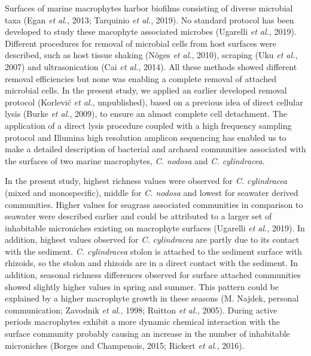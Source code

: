 \documentclass[12pt,]{article}
\begin{document}
Surfaces of marine macrophytes harbor biofilms consisting of diverse
microbial taxa (Egan \emph{et al.}, 2013; Tarquinio \emph{et al.},
2019). No standard protocol has been developed to study these macophyte
associated microbes (Ugarelli \emph{et al.}, 2019). Different procedures
for removal of microbial cells from host surfaces were described, such
as host tissue shaking (Nõges \emph{et al.}, 2010), scraping (Uku
\emph{et al.}, 2007) and ultrasonication (Cai \emph{et al.}, 2014). All
these methods showed different removal efficiencies but none was
enabling a complete removal of attached microbial cells. In the present
study, we applied an earlier developed removal protocol (Korlević
\emph{et al.}, unpublished), based on a previous idea of direct cellular
lysis (Burke \emph{et al.}, 2009), to ensure an almost complete cell
detachment. The application of a direct lysis procedure coupled with a
high frequency sampling protocol and Illumina high resolution amplicon
sequencing has enabled us to make a detailed description of bacterial
and archaeal communities associated with the surfaces of two marine
macrophytes, \emph{C. nodosa} and \emph{C. cylindracea}.

In the present study, highest richness values were observed for \emph{C.
cylindracea} (mixed and monospecific), middle for \emph{C. nodosa} and
lowest for seawater derived communities. Higher values for seagrass
associated communities in comparison to seawater were described earlier
and could be attributed to a larger set of inhabitable microniches
existing on macrophyte surfaces (Ugarelli \emph{et al.}, 2019). In
addition, highest values observed for \emph{C. cylindracea} are partly
due to its contact with the sediment. \emph{C. cylindracea} stolon is
attached to the sediment surface with rhizoids, so the stolon and
rhizoids are in a direct contact with the sediment. In addition,
seasonal richness differences observed for surface attached communities
showed slightly higher values in spring and summer. This pattern could
be explained by a higher macrophyte growth in these seasons (M. Najdek,
personal communication; Zavodnik \emph{et al.}, 1998; Ruitton \emph{et
al.}, 2005). During active periods macrophytes exhibit a more dynamic
chemical interaction with the surface community probably causing an
increase in the number of inhabitable microniches (Borges and
Champenois, 2015; Rickert \emph{et al.}, 2016).
\end{document}
